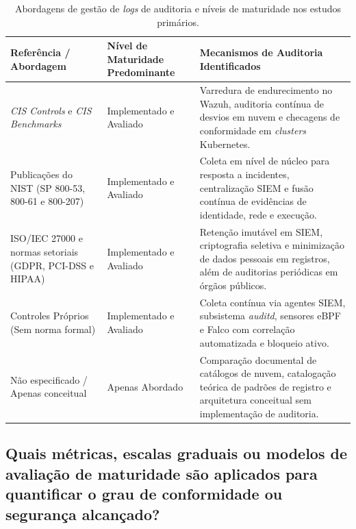 \begin{table}[!htbp]
    \centering
    \caption{Abordagens de gestão de \textit{logs} de auditoria e níveis de maturidade nos estudos primários.}
    \label{tab:rsl_qs07}
    \footnotesize
    \begin{tabular}{p{3.4cm}p{2.9cm}p{7.7cm}}
        \hline
        \textbf{Referência / Abordagem} & \textbf{Nível de Maturidade Predominante} & \textbf{Mecanismos de Auditoria Identificados} \\ \hline
        \textit{CIS Controls} e \textit{CIS Benchmarks} & Implementado e Avaliado & Varredura de endurecimento no Wazuh, auditoria contínua de desvios em nuvem e checagens de conformidade em \textit{clusters} Kubernetes. \\ \hline
        Publicações do NIST (SP 800-53, 800-61 e 800-207) & Implementado e Avaliado & Coleta em nível de núcleo para resposta a incidentes, centralização SIEM e fusão contínua de evidências de identidade, rede e execução. \\ \hline
        ISO/IEC 27000 e normas setoriais (GDPR, PCI-DSS e HIPAA) & Implementado e Avaliado & Retenção imutável em SIEM, criptografia seletiva e minimização de dados pessoais em registros, além de auditorias periódicas em órgãos públicos. \\ \hline
        Controles Próprios (Sem norma formal) & Implementado e Avaliado & Coleta contínua via agentes SIEM, subsistema \textit{auditd}, sensores eBPF e Falco com correlação automatizada e bloqueio ativo. \\ \hline
        Não especificado / Apenas conceitual & Apenas Abordado & Comparação documental de catálogos de nuvem, catalogação teórica de padrões de registro e arquitetura conceitual sem implementação de auditoria. \\ \hline
    \end{tabular}
\end{table}
\FloatBarrier

\subsection{Quais métricas, escalas graduais ou modelos de avaliação de maturidade são aplicados para quantificar o grau de conformidade ou segurança alcançado?}
\label{subsec:rsl_qs08}

